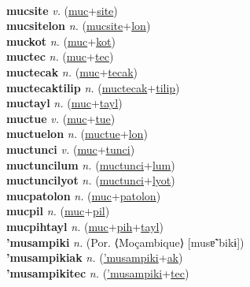  \label{muccwepucolon} \\
\textbf{mucsite} \textit{v.} (\hyperref[muc]{muc}+\hyperref[site]{site})
 \label{mucsite} \\
\textbf{mucsitelon} \textit{n.} (\hyperref[mucsite]{mucsite}+\hyperref[lon]{lon})
 \label{mucsitelon} \\
\textbf{muckot} \textit{n.} (\hyperref[muc]{muc}+\hyperref[kot]{kot})
 \label{muckot} \\
\textbf{muctec} \textit{n.} (\hyperref[muc]{muc}+\hyperref[tec]{tec})
 \label{muctec} \\
\textbf{muctecak} \textit{n.} (\hyperref[muc]{muc}+\hyperref[tecak]{tecak})
 \label{muctecak} \\
\textbf{muctecaktilip} \textit{n.} (\hyperref[muctecak]{muctecak}+\hyperref[tilip]{tilip})
 \label{muctecaktilip} \\
\textbf{muctayl} \textit{n.} (\hyperref[muc]{muc}+\hyperref[tayl]{tayl})
 \label{muctayl} \\
\textbf{muctue} \textit{v.} (\hyperref[muc]{muc}+\hyperref[tue]{tue})
 \label{muctue} \\
\textbf{muctuelon} \textit{n.} (\hyperref[muctue]{muctue}+\hyperref[lon]{lon})
 \label{muctuelon} \\
\textbf{muctunci} \textit{v.} (\hyperref[muc]{muc}+\hyperref[tunci]{tunci})
 \label{muctunci} \\
\textbf{muctuncilum} \textit{n.} (\hyperref[muctunci]{muctunci}+\hyperref[lum]{lum})
 \label{muctuncilum} \\
\textbf{muctuncilyot} \textit{n.} (\hyperref[muctunci]{muctunci}+\hyperref[lyot]{lyot})
 \label{muctuncilyot} \\
\textbf{mucpatolon} \textit{n.} (\hyperref[muc]{muc}+\hyperref[patolon]{patolon})
 \label{mucpatolon} \\
\textbf{mucpil} \textit{n.} (\hyperref[muc]{muc}+\hyperref[pil]{pil})
 \label{mucpil} \\
\textbf{mucpihtayl} \textit{n.} (\hyperref[muc]{muc}+\hyperref[pih]{pih}+\hyperref[tayl]{tayl})
 \label{mucpihtayl} \\
\textbf{'musampiki} \textit{n.} (Por. ⟨Moçambique⟩ [musɐ̃ˈbikɨ])
 \label{'musampiki} \\
\textbf{'musampikiak} \textit{n.} (\hyperref['musampiki]{'musampiki}+\hyperref[ak]{ak})
 \label{'musampikiak} \\
\textbf{'musampikitec} \textit{n.} (\hyperref['musampiki]{'musampiki}+\hyperref[tec]{tec})
 \label{'musampikitec} \\

